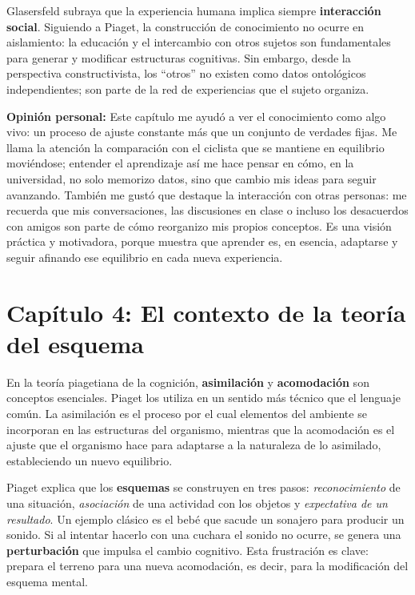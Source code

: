 \documentclass{article}
\begin{document}
Glasersfeld subraya que la experiencia humana implica siempre \textbf{interacción social}. Siguiendo a Piaget, la construcción de conocimiento no ocurre en aislamiento: la educación y el intercambio con otros sujetos son fundamentales para generar y modificar estructuras cognitivas. Sin embargo, desde la perspectiva constructivista, los ``otros'' no existen como datos ontológicos independientes; son parte de la red de experiencias que el sujeto organiza.

\textbf{Opinión personal:}  
Este capítulo me ayudó a ver el conocimiento como algo vivo: un proceso de ajuste constante más que un conjunto de verdades fijas. Me llama la atención la comparación con el ciclista que se mantiene en equilibrio moviéndose; entender el aprendizaje así me hace pensar en cómo, en la universidad, no solo memorizo datos, sino que cambio mis ideas para seguir avanzando. También me gustó que destaque la interacción con otras personas: me recuerda que mis conversaciones, las discusiones en clase o incluso los desacuerdos con amigos son parte de cómo reorganizo mis propios conceptos. Es una visión práctica y motivadora, porque muestra que aprender es, en esencia, adaptarse y seguir afinando ese equilibrio en cada nueva experiencia.

\section*{Capítulo 4: El contexto de la teoría del esquema}

En la teoría piagetiana de la cognición, \textbf{asimilación} y \textbf{acomodación} son conceptos esenciales. Piaget los utiliza en un sentido más técnico que el lenguaje común. La asimilación es el proceso por el cual elementos del ambiente se incorporan en las estructuras del organismo, mientras que la acomodación es el ajuste que el organismo hace para adaptarse a la naturaleza de lo asimilado, estableciendo un nuevo equilibrio.

Piaget explica que los \textbf{esquemas} se construyen en tres pasos: \textit{reconocimiento} de una situación, \textit{asociación} de una actividad con los objetos y \textit{expectativa de un resultado}. Un ejemplo clásico es el bebé que sacude un sonajero para producir un sonido. Si al intentar hacerlo con una cuchara el sonido no ocurre, se genera una \textbf{perturbación} que impulsa el cambio cognitivo. Esta frustración es clave: prepara el terreno para una nueva acomodación, es decir, para la modificación del esquema mental.
\end{document}
